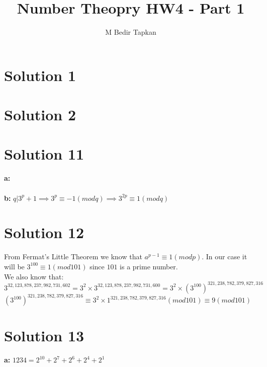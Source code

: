 \documentclass[12pt]{article}
\title{Number Theopry HW4 - Part 1}
\author{M Bedir Tapkan}
\begin{document}
	\maketitle\textsl{}

\section*{Solution 1}



\section*{Solution 2}

\section*{Solution 11}
 \textbf{a:}
 \\\\
 \textbf{b:} 
 $q | 3^p + 1 \implies 3^p \equiv -1 (mod q) \implies 3^{2p} \equiv 1 (mod q)$\\

\section*{Solution 12}
From Fermat's Little Theorem we know that $a^{p-1} \equiv 1 (mod p)$. In our case it will be $3^{100} \equiv 1 (mod 101)$ since $101$ is a prime number.\\
We also know that:\\
$3^{32,123,878,237,982,731,602}  = 3^2 \times 3^{32,123,878,237,982,731,600} = 3^2 \times (3^{100})^{321,238,782,379,827,316}$\\
$(3^{100})^{321,238,782,379,827,316} \equiv 3^2 \times 1^{321,238,782,379,827,316} (mod 101) \equiv 9 (mod 101)$

\section*{Solution 13}
\textbf{a:} $1234 = 2^{10} + 2^7 + 2^6 + 2^4 + 2^1$\\
\end{document}
